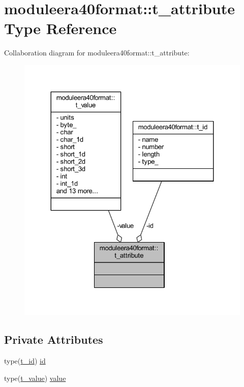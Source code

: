\hypertarget{structmoduleera40format_1_1t__attribute}{}\section{moduleera40format\+:\+:t\+\_\+attribute Type Reference}
\label{structmoduleera40format_1_1t__attribute}


Collaboration diagram for moduleera40format\+:\+:t\+\_\+attribute\+:\nopagebreak
\begin{figure}[H]
\begin{center}
\leavevmode
\includegraphics[width=324pt]{structmoduleera40format_1_1t__attribute__coll__graph}
\end{center}
\end{figure}
\subsection*{Private Attributes}
\begin{DoxyCompactItemize}
\item 
type(\mbox{\hyperlink{structmoduleera40format_1_1t__id}{t\+\_\+id}}) \mbox{\hyperlink{structmoduleera40format_1_1t__attribute_a356732e6fbb1b1550724bf402872c46a}{id}}
\item 
type(\mbox{\hyperlink{structmoduleera40format_1_1t__value}{t\+\_\+value}}) \mbox{\hyperlink{structmoduleera40format_1_1t__attribute_ab4796a35681a19055b9f2075335331c9}{value}}
\end{DoxyCompactItemize}



